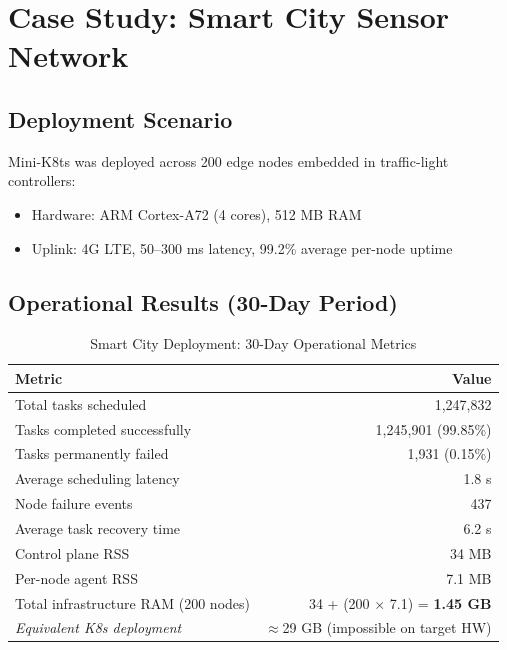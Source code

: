 \documentclass[11pt,a4paper]{article}
\begin{document}
\section{Case Study: Smart City Sensor Network}

\subsection{Deployment Scenario}

Mini-K8ts was deployed across 200 edge nodes embedded in traffic-light controllers:

\begin{itemize}
  \item Hardware: ARM Cortex-A72 (4 cores), 512 MB RAM
  \item Uplink: 4G LTE, 50--300 ms latency, 99.2\% average per-node uptime
\end{itemize}

\subsection{Operational Results (30-Day Period)}

\begin{table}[H]
\centering
\caption{Smart City Deployment: 30-Day Operational Metrics}
\label{tab:case_study}
\begin{tabular}{@{} l r @{}}
\toprule
\textbf{Metric}                          & \textbf{Value} \\
\midrule
Total tasks scheduled                    & 1{,}247{,}832 \\
Tasks completed successfully             & 1{,}245{,}901 (99.85\%) \\
Tasks permanently failed                 & 1{,}931 (0.15\%) \\
Average scheduling latency               & 1.8 s \\
Node failure events                      & 437 \\
Average task recovery time               & 6.2 s \\
Control plane RSS                        & 34 MB \\
Per-node agent RSS                       & 7.1 MB \\
Total infrastructure RAM (200 nodes)     & 34 + (200 $\times$ 7.1) = \textbf{1.45 GB} \\
\midrule
\textit{Equivalent K8s deployment}       & $\approx$29 GB (impossible on target HW) \\
\bottomrule
\end{tabular}
\end{table}
\end{document}
